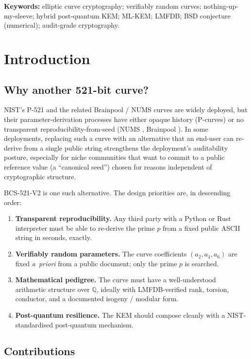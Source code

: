 \documentclass[11pt,a4paper]{article}
\theoremstyle{plain}
\theoremstyle{definition}
\newcommand{\Q}{\mathbb{Q}}
\newcommand{\BCSV}{\textsf{BCS\hbox{-}521\hbox{-}V2}}
\begin{document}
\noindent\textbf{Keywords:}
elliptic curve cryptography; verifiably random curves; nothing-up-my-sleeve;
hybrid post-quantum KEM; ML-KEM; LMFDB; BSD conjecture (numerical);
audit-grade cryptography.

\section{Introduction}
\label{sec:intro}

\subsection{Why another 521-bit curve?}

NIST's P-521 and the related Brainpool / NUMS curves are widely
deployed, but their parameter-derivation processes have either
opaque history (P-curves) \cite{NSA-Dual-EC, BMS-CurveAudit} or
no transparent reproducibility-from-seed (NUMS \cite{NUMSCurves},
Brainpool \cite{Brainpool}). In some deployments, replacing such a
curve with an alternative that an end-user can re-derive from a
single public string strengthens the deployment's auditability
posture, especially for niche communities that want to commit to a
public reference value (a ``canonical seed'') chosen for reasons
independent of cryptographic structure.

\BCSV{} is one such alternative. The design priorities are, in
descending order:
\begin{enumerate}[label=(\arabic*)]
  \item \textbf{Transparent reproducibility.} Any third party with a
    Python or Rust interpreter must be able to re-derive the prime
    $p$ from a fixed public ASCII string in seconds, exactly.
  \item \textbf{Verifiably random parameters.} The curve coefficients
    $(a_2, a_4, a_6)$ are fixed \emph{a~priori} from a public
    document; only the prime $p$ is searched.
  \item \textbf{Mathematical pedigree.} The curve must have a
    well-understood arithmetic structure over $\Q$, ideally with
    LMFDB-verified rank, torsion, conductor, and a documented
    isogeny / modular form.
  \item \textbf{Post-quantum resilience.} The KEM should compose
    cleanly with a NIST-standardised post-quantum mechanism.
\end{enumerate}

\subsection{Contributions}
\end{document}
